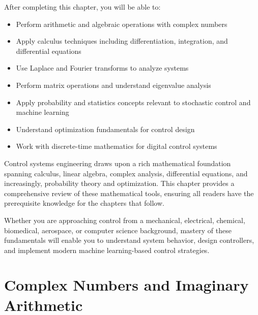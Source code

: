 

\begin{keyconceptbox}[title=Learning Objectives]
After completing this chapter, you will be able to:
\begin{itemize}
    \item Perform arithmetic and algebraic operations with complex numbers
    \item Apply calculus techniques including differentiation, integration, and differential equations
    \item Use Laplace and Fourier transforms to analyze systems
    \item Perform matrix operations and understand eigenvalue analysis
    \item Apply probability and statistics concepts relevant to stochastic control and machine learning
    \item Understand optimization fundamentals for control design
    \item Work with discrete-time mathematics for digital control systems
\end{itemize}
\end{keyconceptbox}

Control systems engineering draws upon a rich mathematical foundation spanning calculus, linear algebra, complex analysis, differential equations, and increasingly, probability theory and optimization. This chapter provides a comprehensive review of these mathematical tools, ensuring all readers have the prerequisite knowledge for the chapters that follow.

Whether you are approaching control from a mechanical, electrical, chemical, biomedical, aerospace, or computer science background, mastery of these fundamentals will enable you to understand system behavior, design controllers, and implement modern machine learning-based control strategies.

\chapter{Complex Numbers and Imaginary Arithmetic}
\label{ch:complex_numbers}

